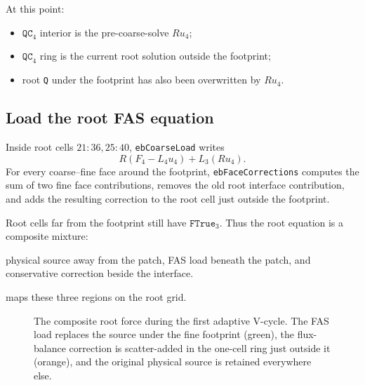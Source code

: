 \documentclass[11pt,oneside,openany]{book}
\newcommand{\code}[1]{\textnormal{\texttt{#1}}}
\begin{document}
At this point:
\begin{itemize}
\item \ensuremath{\mathtt{QC}_{4}} interior is the pre-coarse-solve $Ru_4$;
\item \ensuremath{\mathtt{QC}_{4}} ring is the current root solution outside the footprint;
\item root \code{Q} under the footprint has also been overwritten by $Ru_4$.
\end{itemize}

\subsection{Load the root FAS equation}
Inside root cells $21{:}36,25{:}40$, \code{ebCoarseLoad} writes
\[
 R(F_4-L_4u_4)+L_3(Ru_4).
\]
For every coarse--fine face around the footprint, \code{ebFaceCorrections} computes the sum of two fine face contributions, removes the old root interface contribution, and adds the resulting correction to the root cell just outside the footprint.

Root cells far from the footprint still have \ensuremath{\mathtt{FTrue}_{3}}. Thus the root equation is a composite mixture:
\begin{center}
physical source away from the patch, FAS load beneath the patch, and conservative correction beside the interface.
\end{center}
 maps these three regions on the root grid.

\begin{figure}[H]
\centering
{}
\caption{The composite root force during the first adaptive V-cycle. The FAS load replaces the source under the fine footprint (green), the flux-balance correction is scatter-added in the one-cell ring just outside it (orange), and the original physical source is retained everywhere else.}
\label{fig:rootforcemap}
\end{figure}
\end{document}
